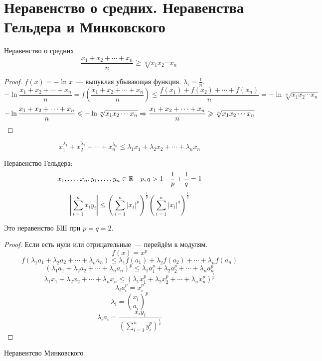 ﻿\section{Неравенство о средних. Неравенства Гельдера и Минковского}

\begin{conseq}
Неравенство о средних
$$\frac{x_1 + x_2 + \cdots + x_n}n \geqslant \sqrt[n]{x_1x_2 \cdots x_n}$$
\end{conseq}
\begin{proof}
$f(x) = -\ln x$~--- выпуклая убывающая функция. $\lambda_i = \frac1n$.
$$-\ln \frac{x_1 + x_2 + \cdots + x_n}n = f \left(\frac{x_1 + x_2 + \cdots + x_n}n\right) \leqslant \frac{f(x_1) + f(x_2) + \cdots + f(x_n)}n = -\ln \sqrt[n]{x_1x_2 \cdots x_n}$$
$$-\ln \frac{x_1 + x_2 + \cdots + x_n}n \leqslant -\ln \sqrt[n]{x_1x_2 \cdots x_n} \Rightarrow \frac{x_1 + x_2 + \cdots + x_n}n \geqslant \sqrt[n]{x_1x_2 \cdots x_n}$$
\end{proof}
\begin{conseq}
$$x_1^{\lambda_1} + x_2^{\lambda_2} + \cdots + x_n^{\lambda_n} \leqslant \lambda_1x_1 + \lambda_2x_2 + \cdots + \lambda_n x_n$$
\end{conseq}
\begin{conseq}
Неравенство Гельдера:
$$x_1, \ldots, x_n, y_1, \ldots, y_n \in \mathbb{R} \quad p,q > 1 \quad \frac1p + \frac1q = 1$$
$$\left|\sum_{i=1}^n x_iy_i\right| \leqslant \left(\sum_{i=1}^n |x_i|^p\right)^{\frac1p} \left(\sum_{i=1}^n |x_i|^q\right)^{\frac1q}$$
\end{conseq}
\begin{Rem}
Это неравенство БШ при $p=q=2$.
\end{Rem}
\begin{proof}
Если есть нули или отрицательные~--- перейдём к модулям.
$$f(x) = x^p$$
$$f\left( \lambda_1a_1 + \lambda_2a_2 + \cdots + \lambda_n a_n \right) \leqslant \lambda_1f(a_1) + \lambda_2f(a_2) + \cdots + \lambda_nf(a_n)$$
$$\left( \lambda_1a_1 + \lambda_2a_2 + \cdots + \lambda_n a_n \right)^p \leqslant \lambda_1 a_1^p + \lambda_2 a_2^p + \cdots + \lambda_n a_n^p$$
$$\lambda_1x_1 + \lambda_2x_2 + \cdots + \lambda_n x_n \leqslant \left(\lambda_1 x_1^p + \lambda_2 x_2^p + \cdots + \lambda_n x_n^p \right)^{\frac1p}$$
$$ \lambda_i a_i^p = x_i^p $$
$$ \lambda_i = \left(\frac{x_i}{a_i}\right)^p$$
$$ \lambda_i a_i = \frac{x_iy_i}{(\sum_{i=1}^n y_i^p) ^ {\frac1q}}$$
\end{proof}

\begin{conseq}
Неравентсво Минковского
\end{conseq}